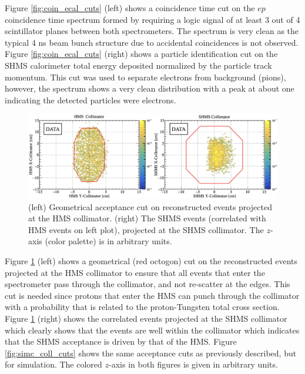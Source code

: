 \documentclass[aps, prl]{revtex4-2}  %
\begin{document}
\indent Figure \ref{fig:coin_ecal_cuts} (left) shows a coincidence time cut on the $ep$ coincidence time spectrum formed by requiring a logic signal of
at least 3 out of 4 scintillator planes between both spectrometers. The spectrum is very clean as the typical 4 ns beam bunch structure due to accidental
coincidences is not observed. \\
\indent Figure \ref{fig:coin_ecal_cuts} (right) shows a particle identification cut on the SHMS calorimeter total energy
deposited normalized by the particle track momentum. This cut was used to separate electrons from background (pions), however, the spectrum shows a very clean distribution
with a peak at about one indicating the detected particles were electrons.
\begin{figure}[!h]
\includegraphics[scale=0.24]{collimator_CUT_80MeV_35deg_data.png}
\caption{(left) Geometrical acceptance cut on reconstructed events projected at the HMS collimator. (right) The SHMS events (correlated with HMS events on left plot),
  projected at the SHMS collimator. The $z$-axis (color palette) is in arbitrary units.}
\label{fig:data_coll_cuts}
\end{figure}
\clearpage
\indent Figure \ref{fig:data_coll_cuts} (left) shows a geometrical (red octogon) cut on the reconstructed events projected at the HMS collimator to ensure
that all events that enter the spectrometer pass through the collimator, and not re-scatter at the edges. This cut is needed since protons that enter the
HMS can punch through the collimator with a probability that is related to the proton-Tungsten total cross section.\\
\indent Figure \ref{fig:data_coll_cuts} (right)
shows the correlated events projected at the SHMS collimator which clearly shows that the events are well within the collimator which indicates that the SHMS
acceptance is driven by that of the HMS. Figure \ref{fig:simc_coll_cuts} shows the same acceptance cuts as previously described, but for simulation. The colored
$z$-axis in both figures is given in arbitrary units.\\
\end{document}
